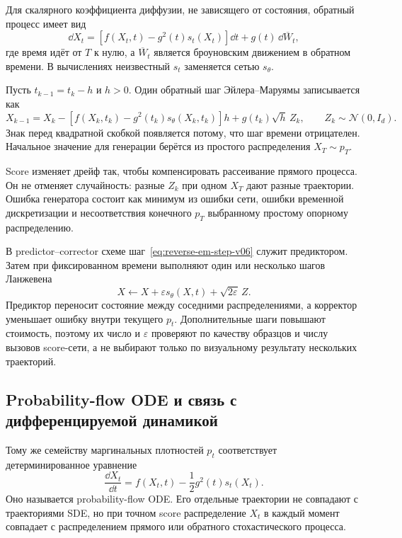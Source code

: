 Для скалярного коэффициента диффузии, не зависящего от состояния, обратный процесс имеет вид
\begin{equation}\label{eq:reverse-time-sde-v06}
\dd X_t = \left[ f(X_t,t) - g^2(t)s_t(X_t) \right]\dd t + g(t)\,\dd\overline W_t,
\end{equation}
где время идёт от $T$ к нулю, а $\overline W_t$ является броуновским движением в обратном времени. В вычислениях неизвестный $s_t$ заменяется сетью $s_\theta$.

Пусть $t_{k-1}=t_k-h$ и $h>0$. Один обратный шаг Эйлера--Маруямы записывается как
\begin{equation}\label{eq:reverse-em-step-v06}
X_{k-1} = X_k - \left[ f(X_k,t_k) - g^2(t_k)s_\theta(X_k,t_k) \right]h + g(t_k)\sqrt h\,Z_k, \qquad Z_k\sim\mathcal N(0,I_d).
\end{equation}
Знак перед квадратной скобкой появляется потому, что шаг времени отрицателен. Начальное значение для генерации берётся из простого распределения $X_T\sim p_T$.

Score изменяет дрейф так, чтобы компенсировать рассеивание прямого процесса. Он не отменяет случайность: разные $Z_k$ при одном $X_T$ дают разные траектории. Ошибка генератора состоит как минимум из ошибки сети, ошибки временной дискретизации и несоответствия конечного $p_T$ выбранному простому опорному распределению.

В predictor--corrector схеме шаг~\eqref{eq:reverse-em-step-v06} служит предиктором. Затем при фиксированном времени выполняют один или несколько шагов Ланжевена
\begin{equation}\label{eq:langevin-corrector-v06}
X \leftarrow X + \varepsilon s_\theta(X,t) + \sqrt{2\varepsilon}\,Z.
\end{equation}
Предиктор переносит состояние между соседними распределениями, а корректор уменьшает ошибку внутри текущего $p_t$. Дополнительные шаги повышают стоимость, поэтому их число и $\varepsilon$ проверяют по качеству образцов и числу вызовов score-сети, а не выбирают только по визуальному результату нескольких траекторий.

\subsection{Probability-flow ODE и связь с дифференцируемой динамикой}

Тому же семейству маргинальных плотностей $p_t$ соответствует детерминированное уравнение
\begin{equation}\label{eq:probability-flow-ode-v06}
\frac{\dd X_t}{\dd t} = f(X_t,t) - \frac12 g^2(t)s_t(X_t).
\end{equation}
Оно называется probability-flow ODE. Его отдельные траектории не совпадают с траекториями SDE, но при точном score распределение $X_t$ в каждый момент совпадает с распределением прямого или обратного стохастического процесса.

